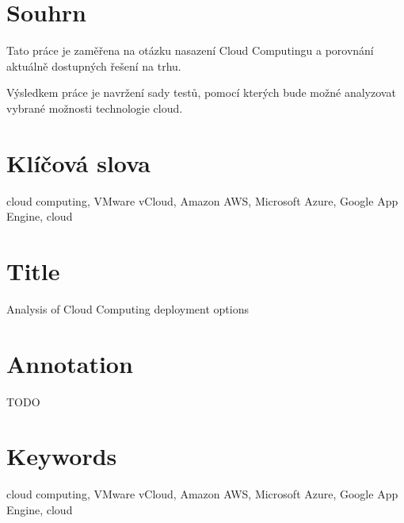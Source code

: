 
\section*{Souhrn}
Tato práce je zaměřena na otázku nasazení Cloud Computingu a porovnání aktuálně dostupných řešení na trhu.

Výsledkem práce je navržení sady testů, pomocí kterých bude možné analyzovat vybrané možnosti technologie cloud.

\section*{Klíčová slova}
cloud computing, VMware vCloud, Amazon AWS, Microsoft Azure, Google App Engine, cloud

\section*{Title}
Analysis of Cloud Computing deployment options

\section*{Annotation}
TODO

\section*{Keywords}
cloud computing, VMware vCloud, Amazon AWS, Microsoft Azure, Google App Engine, cloud